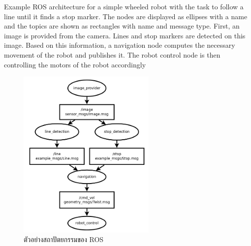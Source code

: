 Example ROS architecture for a simple wheeled robot with the task to
follow  a  line  until  it  finds  a  stop  marker.   The  nodes  are  displayed  as
ellipses with a name and the topics are shown as rectangles with name
and message type.  First, an image is provided from the camera.  Lines
and stop markers are detected on this image.  Based on this information,
a navigation node computes the necessary movement of the robot and
publishes it.  The robot
control node is then controlling the motors of
the robot accordingly
\begin{figure}[htbp]
    \centering
    \includegraphics[width=0.6\textwidth]{chapter2/images/example_ros.png}
    \caption{ตัวอย่างสถาปัตยกรรมของ ROS}
    \label{fig:poppy_humanoid}
\end{figure}


